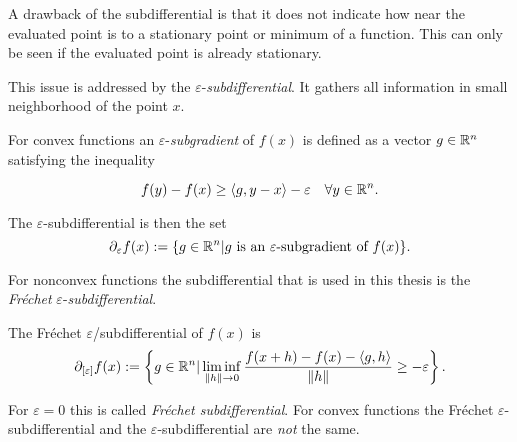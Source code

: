 
A drawback of the subdifferential is that it does not indicate how near the evaluated point is to a stationary point or minimum of a function. This can only be seen if the evaluated point is already stationary.

This issue is addressed by the \(\varepsilon\)-\emph{subdifferential}. It gathers all information in small neighborhood of the point \(x\).

For convex functions an \(\varepsilon\)-\emph{subgradient} of \(f(x)\) is defined as a vector \(g \in \mathbb{R}^n\) satisfying the inequality

\[ f(y)-f(x) \geq \left\langle g,y-x \right\rangle - \varepsilon \quad \forall y \in \mathbb{R}^n.\]

The \(\varepsilon\)-subdifferential is then the set
\[ \partial_{\varepsilon} f(x) := \{g \in \mathbb{R}^n | g \text{ is an } \varepsilon \text{-subgradient of } f(x)\}. \]

For nonconvex functions the subdifferential that is used in this thesis is the \emph{Fr\'{e}chet} \(\varepsilon\)-\emph{subdifferential}.

\begin{definition}
	The Fr\'{e}chet \(\varepsilon\)/subdifferential of \(f(x)\) is
	\[ \partial_{[\varepsilon]}f(x) := \left\{ g \in \mathbb{R}^n | \liminf_{\|h\| \to 0} \frac{f(x+h)-f(x)-\langle g,h\rangle}{\|h\|}  \geq -\varepsilon\right\}. \]
\end{definition}

For \(\varepsilon = 0\) this is called \emph{Fr\'echet subdifferential}.
For convex functions the Fr\'echet \(\varepsilon\)-subdifferential and the \(\varepsilon\)-subdifferential are \emph{not} the same.




